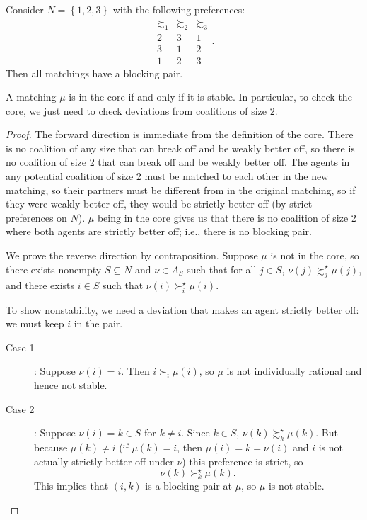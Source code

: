 \begin{example}
	Consider $N = \left\{1,2,3\right\}$ with the following preferences:
	\[
		\begin{array}{ccc}
			\succsim_1 & \succsim_2 & \succsim_3 \\
			\hline
			2 & 3 & 1 \\
			3 & 1 & 2 \\
			1 & 2 & 3
		\end{array}
	.\]
	Then all matchings have a blocking pair.
\end{example}

\begin{proposition}
	A matching $\mu$ is in the core if and only if it is stable. In particular, to check the core, we just need to check deviations from coalitions of size $2$.
\end{proposition}
\begin{proof}
	The forward direction is immediate from the definition of the core. There is no coalition of any size that can break off and be weakly better off, so there is no coalition of size 2 that can break off and be weakly better off. The agents in any potential coalition of size 2 must be matched to each other in the new matching, so their partners must be different from in the original matching, so if they were weakly better off, they would be strictly better off (by strict preferences on $N$). $\mu$ being in the core gives us that there is no coalition of size 2 where both agents are strictly better off; i.e., there is no blocking pair.

	We prove the reverse direction by contraposition. Suppose $\mu$ is not in the core, so there exists nonempty $S \subseteq N$ and $\nu \in A_S$ such that for all $j \in S$, $\nu(j) \succsim_j^\star \mu(j)$, and there exists $i \in S$ such that $\nu(i) \succ_i^\star \mu(i)$.

	To show nonstability, we need a deviation that makes an agent strictly better off: we must keep $i$ in the pair.
	\begin{description}
		\item[Case 1]: Suppose $\nu(i) = i$.
		Then $i \succ_i \mu(i)$, so $\mu$ is not individually rational and hence not stable.
		\item[Case 2]: Suppose $\nu(i) = k \in S$ for $k \ne i$.
		Since $k \in S$, $\nu(k) \succsim_k^\star \mu(k)$.
		But because $\mu(k) \ne i$ (if $\mu(k) = i$, then $\mu(i) = k = \nu(i)$ and $i$ is not actually strictly better off under $\nu$) this preference is strict, so \[
			\nu(k) \succ_k^\star \mu(k)
		.\] This implies that $(i,k)$ is a blocking pair at $\mu$, so $\mu$ is not stable.
	\end{description}
\end{proof}

